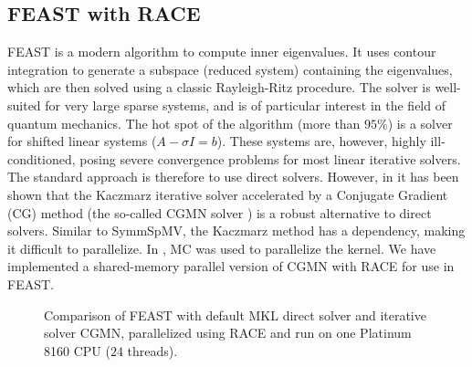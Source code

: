 \subsection{FEAST with RACE}
FEAST\cite{FEAST} is a modern algorithm to compute inner eigenvalues.
It uses contour integration to generate a subspace (reduced system) containing the eigenvalues,
which are then solved using a classic Rayleigh-Ritz procedure. The solver is
well-suited for very large sparse systems, and is of particular interest in the field
of quantum mechanics.
 The hot spot of the algorithm (more than $95\%$) is a solver for
 shifted linear systems ($A- \sigma I = b$). These systems are, however, highly %
 ill-conditioned, posing severe convergence
 problems for most linear iterative solvers. The standard approach
 is therefore to use direct solvers. However, in \cite{feast_mc} it has been shown
 that the Kaczmarz iterative solver accelerated by a Conjugate Gradient (CG) method
 (the  so-called CGMN solver \cite{cgmn}) is a robust alternative to direct solvers. 
Similar to \acrshort{SymmSpMV}, the Kaczmarz method has a \DTWO dependency, making
it difficult to parallelize. In \cite{feast_mc}, \acrlong{MC} was used to
parallelize the kernel. We have implemented a shared-memory parallel version of CGMN with \acrshort{RACE} for use in FEAST.

\begin{figure}[b]
	\centering
	\caption{\label{fig:feast} Comparison of FEAST with default
          \acrshort{MKL} direct solver and iterative solver CGMN,
          parallelized using \acrshort{RACE} and run on
          one \SKX Platinum 8160 CPU ($24$ threads). }
\end{figure}

